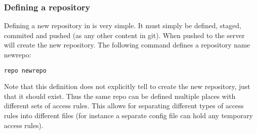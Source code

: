 \subsubsection{Defining a repository}
Defining a new repository in \gitolite{} is very simple.
It must simply be defined, staged, commited and pushed (as any other content in git).
When pushed to the server \gitolite{} will create the new repository.
The following command defines a repository name newrepo:
\begin{center}
\texttt{repo newrepo}
\end{center}
Note that this definition does not explicitly tell \gitolite{} to create the new repository, just that it should exist.
Thus the same repo can be defined multiple places with different sets of access rules.
This allows for separating different types of access rules into different files (for instance a separate config file can hold any temporary access rules).


